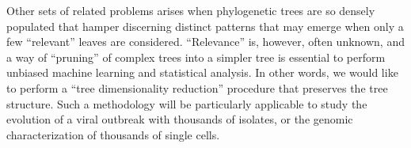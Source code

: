 \documentclass[a4paper,11pt]{article}
\begin{document}
Other sets of related problems arises when phylogenetic trees are so densely populated that hamper discerning distinct patterns that may emerge when only a few ``relevant'' leaves are considered.
``Relevance'' is, however, often unknown, and a way of ``pruning'' of complex trees into a simpler tree is essential to perform unbiased machine learning and statistical analysis.
In other words, we would like to perform a ``tree dimensionality reduction'' procedure that preserves the tree structure. Such a methodology will be particularly applicable to study the evolution of a viral outbreak with thousands of isolates, or the genomic characterization of thousands of single cells.
\end{document}
